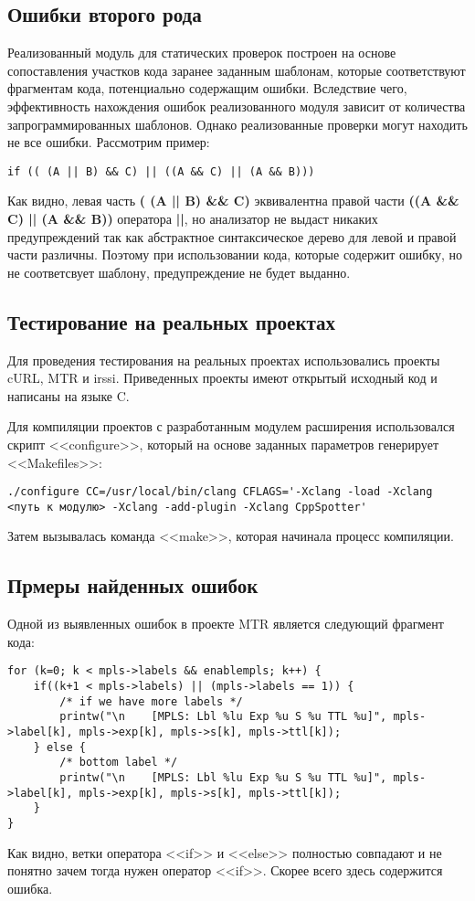 \subsection*{Ошибки второго рода}
Реализованный модуль для статических проверок построен на основе сопоставления участков кода заранее
заданным шаблонам, которые соответствуют фрагментам кода, потенциально содержащим ошибки.
Вследствие чего, эффективность нахождения ошибок реализованного модуля зависит от количества запрограммированных шаблонов.
Однако реализованные проверки могут находить не все ошибки. Рассмотрим пример:
\begin{lstlisting}
if (( (A || B) && C) || ((A && C) || (A && B)))
\end{lstlisting}
Как видно, левая часть \textbf{( (A || B) \&\& C)} эквивалентна правой части \textbf{((A \&\& C) || (A \&\& B))}
оператора \textbf{||}, но анализатор не выдаст никаких предупреждений так как абстрактное синтаксическое дерево 
для левой и правой части различны. Поэтому при использовании кода, которые содержит ошибку, но не соответсвует шаблону,
предупреждение не будет выданно.

\subsection{Тестирование на реальных проектах}
Для проведения тестирования на реальных проектах использовались проекты cURL\cite{curl}, MTR\cite{mtr} и irssi\cite{irssi}.
Приведенных проекты имеют открытый исходный код и написаны на языке C. 

Для компиляции проектов с разработанным модулем расширения использовался скрипт <<configure>>, который на основе 
заданных параметров генерирует <<Makefiles>>:
\begin{lstlisting}
./configure CC=/usr/local/bin/clang CFLAGS='-Xclang -load -Xclang <путь к модулю> -Xclang -add-plugin -Xclang CppSpotter'
\end{lstlisting}
Затем вызывалась команда <<make>>, которая начинала процесс компиляции.

\subsection*{Прмеры найденных ошибок}
Одной из выявленных ошибок в проекте MTR является следующий фрагмент кода:
\begin{lstlisting}
for (k=0; k < mpls->labels && enablempls; k++) {
	if((k+1 < mpls->labels) || (mpls->labels == 1)) {
    	/* if we have more labels */
        printw("\n    [MPLS: Lbl %lu Exp %u S %u TTL %u]", mpls->label[k], mpls->exp[k], mpls->s[k], mpls->ttl[k]);
    } else {
        /* bottom label */
        printw("\n    [MPLS: Lbl %lu Exp %u S %u TTL %u]", mpls->label[k], mpls->exp[k], mpls->s[k], mpls->ttl[k]);
    }
}
\end{lstlisting}
Как видно, ветки оператора <<if>> и <<else>> полностью совпадают и не понятно зачем тогда нужен оператор <<if>>. Скорее
всего здесь содержится ошибка.

